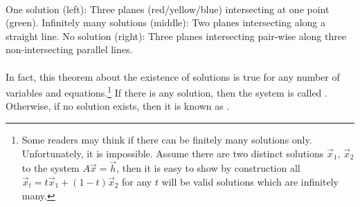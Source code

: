     \hfill
    \begin{minipage}{0.3\textwidth}
    \end{minipage}
    \hspace*{\fill}\\
One solution (left): Three planes (red/yellow/blue) intersecting at one point (green). Infinitely many solutions (middle): Two planes intersecting along a straight line. No solution (right): Three planes intersecting pair-wise along three non-intersecting parallel lines. \\
\\
In fact, this theorem about the existence of solutions is true for any number of variables and equations.\footnote{Some readers may think if there can be finitely many solutions only. Unfortunately, it is impossible. Assume there are two distinct solutions $\vec{x}_1$, $\vec{x}_2$ to the system $A\vec{x} = \vec{h}$, then it is easy to show by construction all $\vec{x}_t = t\vec{x}_1 + (1-t)\vec{x}_2$ for any $t$ will be valid solutions which are infinitely many.} If there is any solution, then the system is called . Otherwise, if no solution exists, then it is known as . \par

